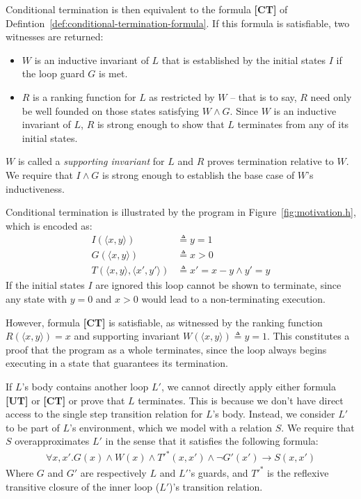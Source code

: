 \documentclass[preprint]{sigplanconf}
\theoremstyle{definition}
\begin{document}
Conditional termination is then equivalent to the
formula {\bf [CT]} of Defintion~\ref{def:conditional-termination-formula}. If this formula is satisfiable,
two witnesses are returned:
\begin{itemize}
\item $W$ is an inductive invariant of $L$ that is established by the initial states $I$ if the loop
guard $G$ is met.
\item $R$ is a ranking function for $L$ as restricted by $W$ -- that is to say, $R$ need only
be well founded on those states satisfying $W \wedge G$.  Since $W$ is an inductive invariant of $L$,
$R$ is strong enough to show that $L$ terminates from any of its initial states.
\end{itemize}

$W$ is called a \emph{supporting invariant} for $L$ and $R$ proves termination relative to $W$.
We require that $I \wedge G$ is strong enough to establish the base case of $W$'s inductiveness.

Conditional termination is illustrated by the program in Figure~\ref{fig:motivation.h},
which is encoded as:
\begin{align*}
            I(\langle x, y \rangle) & \triangleq y = 1 \\
            G(\langle x, y \rangle) & \triangleq x > 0 \\
            T(\langle x, y \rangle, \langle x', y' \rangle) & \triangleq x' = x - y \wedge y' = y 
\end{align*}
If the initial states $I$ are ignored this loop cannot be shown to terminate, since any state with $y = 0$ and $x > 0$
would lead to a non-terminating execution.

However, formula {\bf [CT]} is satisfiable, as witnessed by the ranking function
$R(\langle x,y\rangle) = x$ and supporting invariant $W(\langle x, y \rangle ) \triangleq y = 1$.
This constitutes a proof that the program as a whole terminates, since the loop always begins
executing in a state that guarantees its termination.

If $L$'s body contains another loop $L'$, we cannot directly apply either formula {\bf [UT]} or
{\bf [CT]} or prove that $L$ terminates.  This is because we don't have direct access to the
single step transition relation for $L$'s body.  Instead, we consider $L'$ to be part of
$L$'s environment, which we model with a relation $S$.  We require that $S$ overapproximates
$L'$ in the sense that it satisfies the following formula:
\begin{align*}
 \forall x, x'. G(x) \wedge W(x) \wedge T'^*(x, x') \wedge \lnot G'(x') \rightarrow S(x, x')
\end{align*}
Where $G$ and $G'$ are respectively $L$ and $L'$'s guards, and $T'^*$ is the reflexive transitive closure of
the inner loop ($L'$)'s transition relation.
\end{document}
